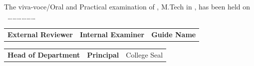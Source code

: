 \vspace{1\baselineskip}

{The viva-voce/Oral and Practical examination of {\textbf{{\myname}}}, M.Tech in \branch,
has been held on \ ………………}

\vspace{5\baselineskip}

\begin{tabular}{p{}p{}p{}}
\textbf{External Reviewer} & \textbf{Internal Examiner} & \textbf{Guide Name}
\end{tabular}

\vspace{4\baselineskip}

\begin{tabular}{p{}p{}p{}}
\textbf{Head of Department} & \textbf{Principal} & College Seal
\end{tabular}


\bigskip